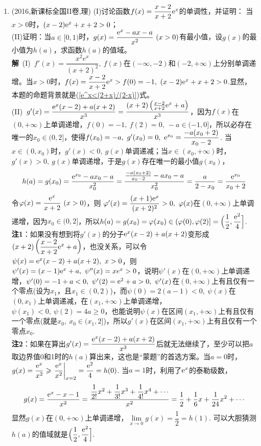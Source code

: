 \begin{enumerate}[label={【\textbf{例\thechapter.\arabic*}】},
 leftmargin=\inteval{\myenumleftmargin}pt,
 itemsep=\inteval{\myenumitempsep}pt,
 itemindent=\inteval{\myenumitemindent}pt]
\item (2016,新课标全国II卷,理) 
(I)讨论函数$ f(x)=\dfrac{x-2}{x+2}\mathrm{e}^x $的单调性，并证明：
当$ x>0 $时，$ (x-2)\mathrm{e}^x+x+2>0 $；\\
(II)证明：当$ a\in[0,1) $时，$ g(x)=\dfrac{\e^x-ax-a}{x^2}\ (x>0) $有最小值，设$ g(x) $的最小值为$ h(a) $，求函数$ h(a) $的值域。\\
\textbf{解}\ (I)\ $ f'(x)=\dfrac{x^2e^x}{(x+2)^2},\ f(x) $在$ (-\infty,-2) $和$ (-2,+\infty) $上分别单调递增。当$ x>0 $时，$ f(x)=\dfrac{x-2}{x+2}\e^x>f(0)=-1,\ (x-2)\e^x+x+2>0 $.显然，本题的命题背景就是(\ref{e^x<(2+x)/(2-x)})式。 \\
(II)\ $ g'(x)=\dfrac{\mathrm{e}^x(x-2)+a(x+2)}{x^3}=\dfrac{(x+2)
\left(\frac{x-2}{x+2}\mathrm{e}^x+a\right)}{x^3} $，因为$ f(x) $在$ (0,+\infty) $上单调递增，$ f(0)=-1,\ f(2)=0,\ -a\in(-1,0] $，所以必存在唯一的$ x_0\in(0,2] $，使得$ f(x_0)=-a,\ g'(x_0)=0,\ \e^{x_0}=\dfrac{-a(x_0+2)}{x_0-2} $. 当$ x\in(0,x_0) $时，$ g'(x)<0,\ g(x) $单调递减；当$ x\in(x_0,+\infty) $时，$ g'(x)>0,\ g(x) $单调递增，于是$ g(x) $存在唯一的最小值$ g(x_0) $，
\begin{gather*}
	h(a)=g(x_0)=\dfrac{\mathrm{e}^{x_0}-ax_0-a}{x_0^2}=
	\dfrac{\frac{-a(x_0+2)}{x_0-2}-ax_0-a}{x_0^2}=
	\dfrac{a}{2-x_0}=\dfrac{\mathrm{e}^{x_0}}{x_0+2}
\end{gather*}
令$ \varphi(x)=\dfrac{\e^{x}}{x+2}\ (x>0) $，则
$ \varphi'(x)=\dfrac{(x+1)\mathrm{e}^{x}}{(x+2)^2}>0,\  \varphi(x) $在$ (0,+\infty) $上单调递增，因为$ x_0\in(0,2] $，所以$ h(a)=g(x_0)=\varphi(x_0)\in(\varphi(0),\varphi(2)]=
\Big(\dfrac{1}{2},\dfrac{\mathrm{e}^2}{4}\Big] $.\\
\textbf{注1}：如果没有想到将$ g'(x) $的分子$ \mathrm{e}^x(x-2)+
a(x+2) $变形成$ (x+2)\left(\dfrac{x-2}{x+2}\mathrm{e}^x+a\right) $，也没关系，可以令$ \psi(x)=\mathrm{e}^x(x-2)+a(x+2),\ x>0 $，则$ \psi'(x)=(x-1)\e^x+a,\ \psi''(x)=xe^x>0 $，说明$ \psi'(x) $在$ (0,+\infty) $上单调递增，$ \psi'(0)=-1+a<0 ,\ \psi'(2)=\e^2+a>0,\ \psi'(x) $在$ (0,+\infty) $上有且仅有一个零点(设为$ x_1 $，且$ x_1\in(0,2) $)，而$ \psi(0)=2(a-1)<0,\ \psi(x) $在$ (0,x_1) $上单调递减，在$ (x_1,+\infty) $上单调递增，$ \psi(x_1)<0,\ \psi(2)=4a\geq 0 $，也能说明$ \psi(x) $在区间$ (x_1,+\infty) $上有且仅有一个零点(就是$ x_0,\ x_0\in(x_1,2] $)，所以$ g'(x) $在区间$ (x_1,+\infty) $上有且仅有一个零点$ x_0 $. \\
\textbf{注2}：如果在算出$ g'(x)=\dfrac{\mathrm{e}^x(x-2)+a(x+2)}
{x^3} $后就无法继续了，至少可以把$ a $取边界值0和1时的$ h(a) $算出来，这也是“蒙题”的首选方案。当$ a=0 $时，$ g(x)=\dfrac{\mathrm{e}^x}{x^2}\geqslant \left.\dfrac{\mathrm{e}^x}{x^2} \right|_{x=2} = \dfrac{\mathrm{e}^2}{4}=h(0) $. 当$ a=1 $时，利用了$ \mathrm{e}^x $的泰勒级数，
\begin{gather*}
  g(x)=\dfrac{\mathrm{e}^x-x-1}{x^2}=\dfrac{\dfrac{1}{2!}x^2+\dfrac{1}{3!}x^3+
 \dfrac{1}{4!}x^4+\cdots}{x^2}=\dfrac{1}{2}+\dfrac{1}{6}x+\dfrac{1}{24}x^2+\cdots
\end{gather*}
显然$ g(x) $在$ (0,+\infty) $上单调递增，$ \lim\limits_{x\to 0}g(x)=\dfrac{1}{2}=h(1) $. 可以大胆猜测$ h(a) $的值域就是$ \Big(\dfrac{1}{2},\dfrac{\mathrm{e}^2}{4}\Big] $. 


\end{enumerate}
